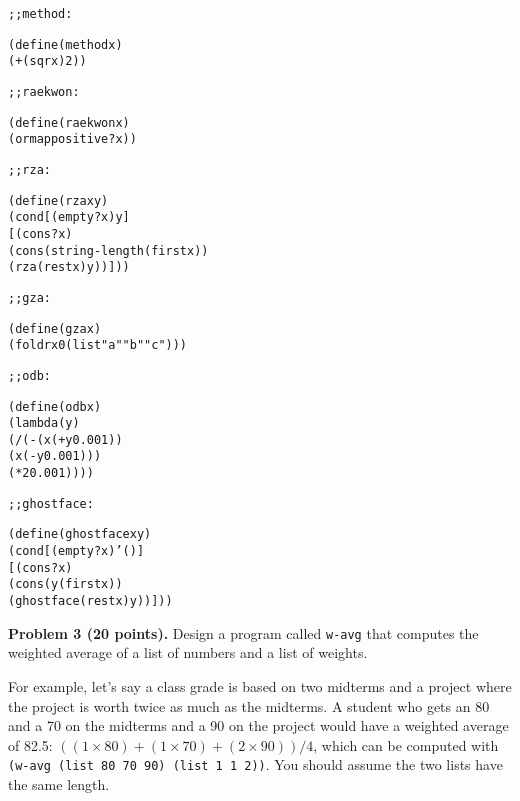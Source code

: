 \documentclass[12pt]{article}
\begin{document}
\begin{alltt}
;; method : 

(define (method x)
  (+ (sqr x) 2))

;; raekwon : 

(define (raekwon x)
  (ormap positive? x))

;; rza : 

(define (rza x y)
  (cond [(empty? x) y]
        [(cons? x)
         (cons (string-length (first x))
               (rza (rest x) y))]))

;; gza : 

(define (gza x)
  (foldr x 0 (list "a" "b" "c")))

;; odb : 

(define (odb x)
  (lambda (y)   
    (/ (- (x (+ y 0.001))
          (x (- y 0.001)))
       (* 2 0.001))))
    

;; ghostface : \censor{[X Y] [Listof X] [X -> Y] -> [Listof Y]}

(define (ghostface x y)
  (cond [(empty? x) '()]
        [(cons? x)
         (cons (y (first x)) 
               (ghostface (rest x) y))]))
\end{alltt}


\newpage

\noindent
{\bf Problem 3 (20 points).}
%
Design a program called {\tt w-avg} that computes the weighted average
of a list of numbers and a list of weights.

For example, let's say a class grade is based on two midterms and a
project where the project is worth twice as much as the midterms.  A
student who gets an 80 and a 70 on the midterms and a 90 on the
project would have a weighted average of 82.5: $((1 \times 80) + (1
\times 70) + (2 \times 90)) / 4$, which can be computed with {\tt
  (w-avg (list 80 70 90) (list 1 1 2))}.  You should assume the two
lists have the same length.
\end{document}
